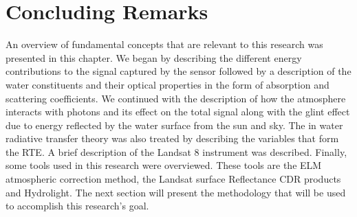 \section{Concluding Remarks}
An overview of fundamental concepts that are relevant to this research was presented in this chapter. We began by describing the different energy contributions to the signal captured by the sensor followed by a description of the water constituents and their optical properties in the form of absorption and scattering coefficients. We continued with the description of how the atmosphere interacts with photons and its effect on the total signal along with the glint effect due to energy reflected by the water surface from the sun and sky. The in water radiative transfer theory was also treated by describing the variables that form the RTE. A brief description of the Landsat 8 instrument was described. Finally, some tools used in this research were overviewed. These tools are the ELM atmospheric correction method, the Landsat surface Reflectance CDR products and Hydrolight. The next section will present the methodology that will be used to accomplish this research's goal.
